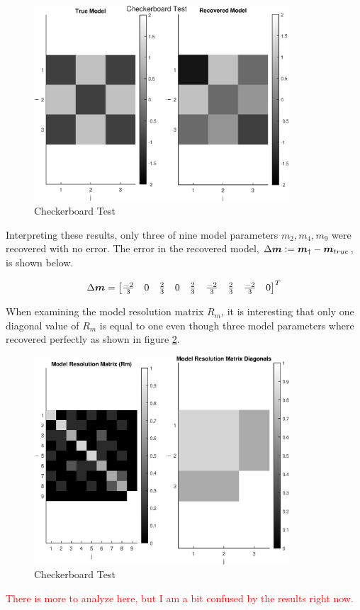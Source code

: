 \begin{figure}[h] 
	\centering
	\includegraphics[width=0.85\textwidth]{./images/prob1_checkerboard_test.eps}
	\caption{Checkerboard Test}
	\label{fig: prob1 checkerboard test}
\end{figure}
\FloatBarrier

Interpreting these results, only three of nine model parameters $m_2, m_4, m_9$ were recovered with no error. The error in the recovered model, $\Delta \boldsymbol{m} \vcentcolon= \boldsymbol{m}_{\dagger} - \boldsymbol{m}_{true}$, is shown below.

\begin{align*}
	\Delta \boldsymbol{m} = \begin{bmatrix}
		\frac{-2}{3} & 0 & \frac{2}{3} & 0 & \frac{2}{3} & \frac{-2}{3} & \frac{2}{3} & \frac{-2}{3} & 0
	\end{bmatrix}^T
\end{align*}

When examining the model resolution matrix $R_m$, it is interesting that only one diagonal value of $R_m$ is equal to one even though three model parameters where recovered perfectly as shown in figure \ref{fig: prob1 Rm}. 

\begin{figure}[h] 
	\centering
	\includegraphics[width=0.85\textwidth]{./images/prob1_Rm.eps}
	\caption{Checkerboard Test}
	\label{fig: prob1 Rm}
\end{figure}
\FloatBarrier

\textcolor{red}{There is more to analyze here, but I am a bit confused by the results right now.}
